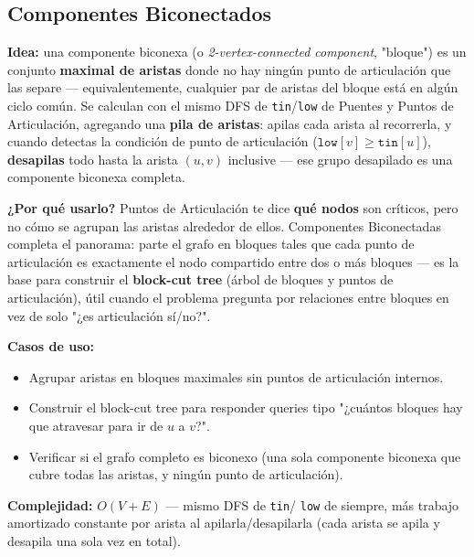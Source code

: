 \documentclass[10pt,a4paper,twocolumn]{article}
\begin{document}
\subsection{Componentes Biconectados}

\textbf{Idea:} una componente biconexa (o \textit{2-vertex-connected
	component}, "bloque") es un conjunto \textbf{maximal de aristas}
donde no hay ningún punto de articulación que las separe —
equivalentemente, cualquier par de aristas del bloque está en algún
ciclo común. Se calculan con el mismo DFS de \texttt{tin}/\texttt{low}
de Puentes y Puntos de Articulación, agregando una \textbf{pila de
	aristas}: apilas cada arista al recorrerla, y cuando detectas la
condición de punto de articulación ($\texttt{low}[v] \ge
\texttt{tin}[u]$), \textbf{desapilas} todo hasta la arista $(u,v)$
inclusive — ese grupo desapilado es una componente biconexa completa.

\textbf{¿Por qué usarlo?} Puntos de Articulación te dice \textbf{qué
	nodos} son críticos, pero no cómo se agrupan las aristas alrededor de
ellos. Componentes Biconectadas completa el panorama: parte el grafo
en bloques tales que cada punto de articulación es exactamente el
nodo compartido entre dos o más bloques — es la base para construir
el \textbf{block-cut tree} (árbol de bloques y puntos de
articulación), útil cuando el problema pregunta por relaciones entre
bloques en vez de solo "¿es articulación sí/no?".

\textbf{Casos de uso:}

\begin{itemize}
	\item Agrupar aristas en bloques maximales sin puntos de
	articulación internos.
	\item Construir el block-cut tree para responder queries tipo
	"¿cuántos bloques hay que atravesar para ir de $u$ a $v$?".
	\item Verificar si el grafo completo es biconexo (una sola
	componente biconexa que cubre todas las aristas, y ningún punto
	de articulación).
\end{itemize}

\textbf{Complejidad:} $O(V + E)$ — mismo DFS de \texttt{tin}/
\texttt{low} de siempre, más trabajo amortizado constante por arista
al apilarla/desapilarla (cada arista se apila y desapila una sola
vez en total).
\end{document}
